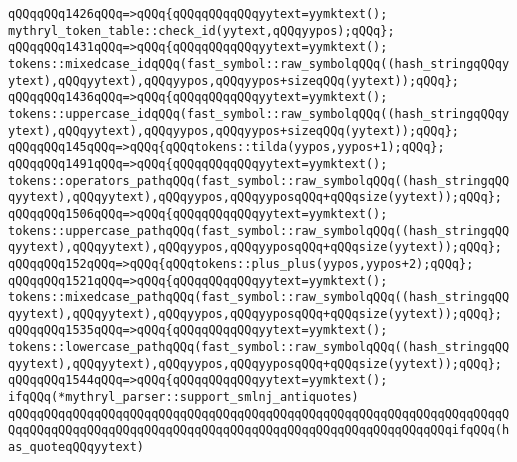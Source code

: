 \verb|qQQqqQQq1426qQQq=>qQQq{qQQqqQQqqQQqyytext=yymktext();|\newline
\verb|mythryl_token_table::check_id(yytext,qQQqyypos);qQQq};|\newline
\verb|qQQqqQQq1431qQQq=>qQQq{qQQqqQQqqQQqyytext=yymktext();|\newline
\verb|tokens::mixedcase_idqQQq(fast_symbol::raw_symbolqQQq((hash_stringqQQqyytext),qQQqyytext),qQQqyypos,qQQqyypos+sizeqQQq(yytext));qQQq};|\newline
\verb|qQQqqQQq1436qQQq=>qQQq{qQQqqQQqqQQqyytext=yymktext();|\newline
\verb|tokens::uppercase_idqQQq(fast_symbol::raw_symbolqQQq((hash_stringqQQqyytext),qQQqyytext),qQQqyypos,qQQqyypos+sizeqQQq(yytext));qQQq};|\newline
\verb|qQQqqQQq145qQQq=>qQQq{qQQqtokens::tilda(yypos,yypos+1);qQQq};|\newline
\verb|qQQqqQQq1491qQQq=>qQQq{qQQqqQQqqQQqyytext=yymktext();|\newline
\verb|tokens::operators_pathqQQq(fast_symbol::raw_symbolqQQq((hash_stringqQQqyytext),qQQqyytext),qQQqyypos,qQQqyyposqQQq+qQQqsize(yytext));qQQq};|\newline
\verb|qQQqqQQq1506qQQq=>qQQq{qQQqqQQqqQQqyytext=yymktext();|\newline
\verb|tokens::uppercase_pathqQQq(fast_symbol::raw_symbolqQQq((hash_stringqQQqyytext),qQQqyytext),qQQqyypos,qQQqyyposqQQq+qQQqsize(yytext));qQQq};|\newline
\verb|qQQqqQQq152qQQq=>qQQq{qQQqtokens::plus_plus(yypos,yypos+2);qQQq};|\newline
\verb|qQQqqQQq1521qQQq=>qQQq{qQQqqQQqqQQqyytext=yymktext();|\newline
\verb|tokens::mixedcase_pathqQQq(fast_symbol::raw_symbolqQQq((hash_stringqQQqyytext),qQQqyytext),qQQqyypos,qQQqyyposqQQq+qQQqsize(yytext));qQQq};|\newline
\verb|qQQqqQQq1535qQQq=>qQQq{qQQqqQQqqQQqyytext=yymktext();|\newline
\verb|tokens::lowercase_pathqQQq(fast_symbol::raw_symbolqQQq((hash_stringqQQqyytext),qQQqyytext),qQQqyypos,qQQqyyposqQQq+qQQqsize(yytext));qQQq};|\newline
\verb|qQQqqQQq1544qQQq=>qQQq{qQQqqQQqqQQqyytext=yymktext();|\newline
\verb|ifqQQq(*mythryl_parser::support_smlnj_antiquotes)|\newline
\verb|qQQqqQQqqQQqqQQqqQQqqQQqqQQqqQQqqQQqqQQqqQQqqQQqqQQqqQQqqQQqqQQqqQQqqQQqqQQqqQQqqQQqqQQqqQQqqQQqqQQqqQQqqQQqqQQqqQQqqQQqqQQqqQQqqQQqifqQQq(has_quoteqQQqyytext)|\newline
